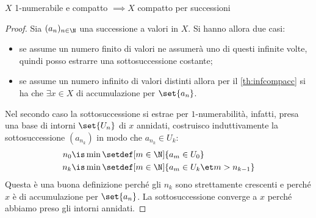 


\begin{prop}
	$X$ 1-numerabile e compatto $\implies X$ compatto per successioni
\end{prop}

\begin{proof}
	Sia $(a_n)_{n\in\N}$ una successione a valori in $X$.
	Si hanno allora due casi:
	\begin{itemize}
		\item
			se assume un numero finito di valori ne assumerà uno di questi infinite volte,
			quindi posso estrarre una sottosuccessione costante;
		\item
			se assume un numero infinito di valori distinti allora per il \autoref{th:infcompacc} si ha che
			$\exists x\in X$ di accumulazione per $\set{a_n}$.
	\end{itemize}
	Nel secondo caso la sottosuccessione si estrae per $1$-numerabilità,
	infatti, presa una base di intorni $\set{U_n}$ di $x$ \wlg annidati,
	costruisco induttivamente la sottosuccessione $(a_{n_k})$ in modo che $a_{n_k}\in U_k$:
	\begin{align*}
		n_0 &\is \min\setdef[m\in\N]{a_m\in U_0} \\
		n_k &\is \min\setdef[m\in\N]{a_m\in U_k\et m>n_{k-1}}
	\end{align*}
	Questa è una buona definizione perché gli $n_k$ sono strettamente crescenti
	e perché $x$ è di accumulazione per $\set{a_n}$.
	La sottosuccessione converge a $x$ perché abbiamo preso gli intorni annidati.
\end{proof}

